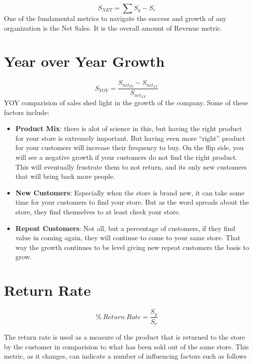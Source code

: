 \documentclass[]{book}
\theoremstyle{definition}
\theoremstyle{definition}
\theoremstyle{definition}
\theoremstyle{remark}
\begin{document}
\[
S_{NET} = \sum{S_{g}-S_{r}}
\] One of the fundamental metrics to navigate the success and growth of
any organization is the Net Sales. It is the overall amount of Revenue
metric.

\hypertarget{year-over-year-growth}{%
\section{Year over Year Growth}\label{year-over-year-growth}}

\[
S_{YOY} = \frac{S_{net_{TY}}-S_{net_{LY}}}{S_{net_{LY}}}
\] YOY comparision of sales shed light in the growth of the company.
Some of these factors include:

\begin{itemize}
\item
  \textbf{Product Mix}: there is alot of science in this, but having the
  right product for your store is extremely important. But having even
  more ``right'' product for your customers will increase their
  frequency to buy. On the flip side, you will see a negative growth if
  your customers do not find the right product. This will eventually
  frustrate them to not return, and its only new customers that will
  bring back more people.
\item
  \textbf{New Customers}: Especially when the store is brand new, it can
  take some time for your customers to find your store. But as the word
  spreads about the store, they find themselves to at least check your
  store.
\item
  \textbf{Repeat Customers}: Not all, but a percentage of customers, if
  they find value in coming again, they will continue to come to your
  same store. That way the growth continues to be level giving new
  repeat customers the basis to grow.
\end{itemize}

\hypertarget{return-rate}{%
\section{Return Rate}\label{return-rate}}

\[
\%\ Return\ Rate = \frac{S_g}{S_r}
\]

The return rate is used as a measure of the product that is returned to
the store by the customer in comparision to what has been sold out of
the same store. This metric, as it changes, can indicate a number of
influencing factors such as follows
\end{document}
